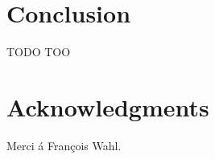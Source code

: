 \documentclass[12pt]{article}
\begin{document}
\newpage

\section{Conclusion}

TODO TOO


\section*{Acknowledgments}
Merci \'a Fran\c cois Wahl.
\end{document}
